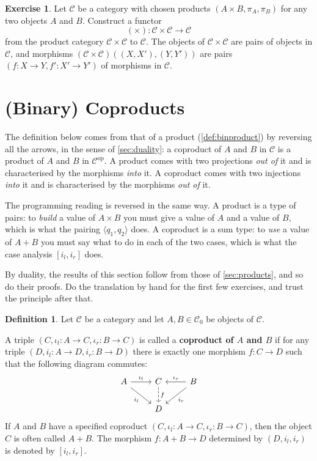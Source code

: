 \documentclass[a4paper,11pt, oneside,titlepage=false]{scrbook}
\theoremstyle{plain}
\theoremstyle{definition}
\newtheorem{dfn}[thm]{Definition}
\newtheorem{exer}[thm]{Exercise}
\newcommand{\Cat}[1]{\mathcal{#1}}
\newcommand{\CC}{\Cat{C}}
\newcommand{\Ob}[1]{{#1}_0}
\newcommand{\CHom}[3]{{#1}(#2,#3)}
\newcommand{\op}[1]{\ensuremath{{#1}^\text{op}}}
\newcommand{\inl}{\ensuremath{\iota_l}}
\newcommand{\inr}{\ensuremath{\iota_r}}
\newcommand{\intoproduct}[2]{\ensuremath{\langle #1, #2 \rangle}}
\newcommand{\outofcoproduct}[2]{\ensuremath{[ #1, #2 ]}}
\begin{document}
\begin{exer}
  Let $\CC$ be a category with chosen products $(A\times B, \pi_A, \pi_B)$ for any two objects $A$ and $B$.
  Construct a functor
  \[ (\times) : \CC\times \CC \to \CC\]
  from the product category $\CC\times \CC$ to $\CC$.
  The objects of $\CC\times \CC$ are pairs of objects in $\CC$, and morphisms $\CHom{(\CC\times\CC)}{(X,X')}{(Y,Y')}$ are pairs $(f : X \to Y, f' : X' \to Y')$ of morphisms in $\CC$.
\end{exer}

\section{(Binary) Coproducts}
\label{sec:coproducts}

The definition below comes from that of a product (\cref{def:binproduct}) by
reversing all the arrows, in the sense of \cref{sec:duality}: a coproduct of
$A$ and $B$ in $\CC$ is a product of $A$ and $B$ in $\op\CC$.
A product comes with two projections \emph{out of} it and is characterised by
the morphisms \emph{into} it.
A coproduct comes with two injections \emph{into} it and is characterised by
the morphisms \emph{out of} it.

The programming reading is reversed in the same way.
A product is a type of pairs: to \emph{build} a value of $A \times B$ you must
give a value of $A$ and a value of $B$, which is what the pairing
$\intoproduct{q_1}{q_2}$ does.
A coproduct is a sum type: to \emph{use} a value of $A + B$ you must say what
to do in each of the two cases, which is what the case analysis
$\outofcoproduct{i_l}{i_r}$ does.

By duality, the results of this section follow from those of
\cref{sec:products}, and so do their proofs.
Do the translation by hand for the first few exercises, and trust the principle
after that.

\begin{dfn}
   Let $\CC$ be a category and let $A,B \in \Ob\CC$ be objects of $\CC$.

  A triple $(C,\inl : A \to C,\inr : B \to C)$ is called a \textbf{coproduct of $A$ and $B$} if for any triple $(D,i_l : A \to D, i_r : B \to D)$ there is exactly one morphism $f : C \to D$ such that the following diagram commutes:
  \[
    \begin{tikzcd}
      A \ar[r, "\inl"] \ar[rd, "i_l"']
      &
      C  \ar[d, dashed, "f"]
      &
      B \ar[l, "\inr"'] \ar[ld, "i_r"]
      \\
      &
      D %
    \end{tikzcd}
  \]
  If $A$ and $B$ have a specified coproduct $(C,\inl : A \to C,\inr : B \to C)$, then the object $C$ is often called $A + B$.
  The morphism $f : A + B \to D$ determined by $(D, i_l, i_r)$ is denoted by $\outofcoproduct{i_l}{i_r}$.

\end{dfn}
\end{document}
